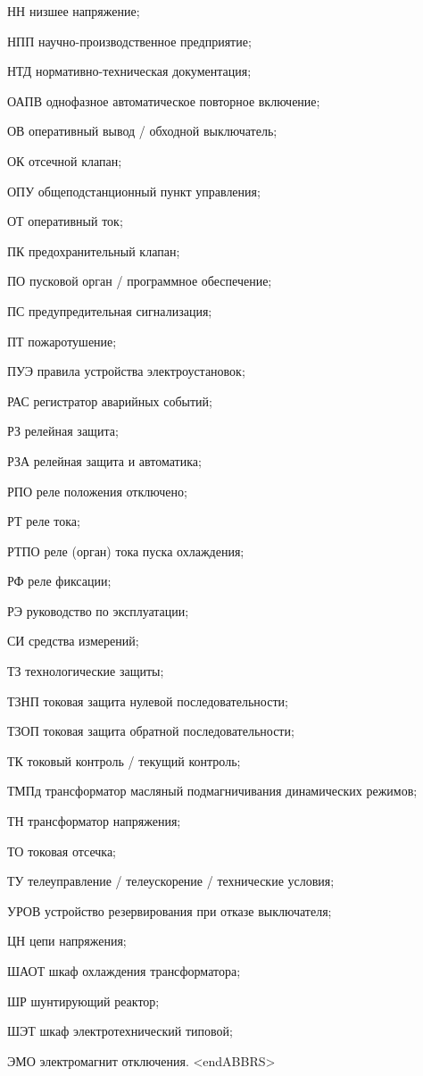 \begin{list}{}
\item[НН] низшее напряжение;
\item[НПП] научно-производственное предприятие;
\item[НТД] нормативно-техническая документация;
\item[ОАПВ] однофазное автоматическое повторное включение;
\item[ОВ] оперативный вывод / обходной выключатель;
\item[ОК] отсечной клапан;
\item[ОПУ] общеподстанционный пункт управления;
\item[ОТ] оперативный ток;
\item[ПК] предохранительный клапан;
\item[ПО] пусковой орган / программное обеспечение;
\item[ПС] предупредительная сигнализация;
\item[ПТ] пожаротушение;
\item[ПУЭ] правила устройства электроустановок;
\item[РАС] регистратор аварийных событий;
\item[РЗ] релейная защита;
\item[РЗА] релейная защита и автоматика;
\item[РПО] реле положения отключено;
\item[РТ] реле тока;
\item[РТПО] реле (орган) тока пуска охлаждения;
\item[РФ] реле фиксации;
\item[РЭ] руководство по эксплуатации;
\item[СИ] средства измерений;
\item[ТЗ] технологические защиты;
\item[ТЗНП] токовая защита нулевой последовательности;
\item[ТЗОП] токовая защита обратной последовательности;
\item[ТК] токовый контроль / текущий контроль;
\item[ТМПд] трансформатор масляный подмагничивания динамических режимов;
\item[ТН] трансформатор напряжения;
\item[ТО] токовая отсечка;
\item[ТУ] телеуправление / телеускорение / технические условия;
\item[УРОВ] устройство резервирования при отказе выключателя;
\item[ЦН] цепи напряжения;
\item[ШАОТ] шкаф охлаждения трансформатора;
\item[ШР] шунтирующий реактор;
\item[ШЭТ] шкаф электротехнический типовой;
\item[ЭМО] электромагнит отключения.
{\color{white}\fontsize{0.1pt}{0.1pt}\selectfont<endABBRS>}
\end{list}
